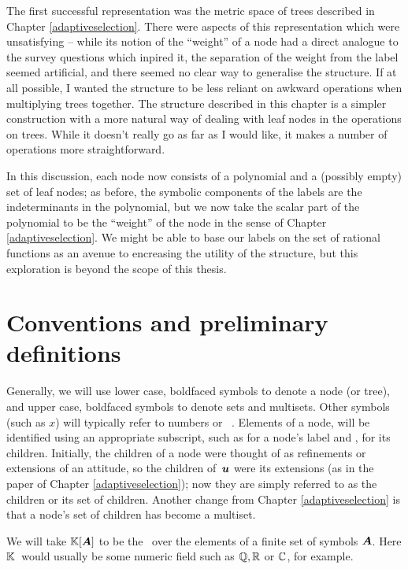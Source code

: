 The first successful representation was the metric space of trees
described in Chapter \ref{adaptiveselection}.  There were aspects of
this representation which were unsatisfying -- while its notion of the
``weight'' of a node had a direct analogue to the survey questions which
inpired it, the separation of the weight from the label seemed
artificial, and there seemed no clear way to generalise the
structure. If at all possible, I wanted the structure to be less reliant
on awkward operations when multiplying trees together.  The structure
described in this chapter is a simpler construction with a more natural
way of dealing with leaf nodes in the operations on trees. While it
doesn't really go as far as I would like, it makes a number of
operations more straightforward.

In this discussion, each node now consists of a polynomial and a
(possibly empty) set of leaf nodes; as before, the symbolic components
of the labels are the indeterminants in the polynomial, but we now
take the scalar part of the polynomial to be the ``weight'' of the
node in the sense of Chapter \ref{adaptiveselection}.  We might be
able to base our labels on the set of rational functions as an avenue
to encreasing the utility of the structure, but this exploration is
beyond the scope of this thesis. 

\section{Conventions and preliminary definitions}

Generally, we will use lower case, boldfaced symbols to denote a node
(or tree), and upper case, boldfaced symbols to denote sets and
multisets.  Other symbols (such as $x$) will typically refer to
numbers or \polyrat\ \polyforms. Elements of a node,  will be
identified using an appropriate subscript, such as  for a
node's label and , for its children. Initially, the children
of a node were thought of as refinements or extensions of an attitude,
so the children of $\,\boldsymbol{u}$ were its extensions (as in the paper of
Chapter \ref{adaptiveselection}); now they are simply referred to as
the children or its set of children.  Another change from Chapter
\ref{adaptiveselection} is that a node's set of children has become a
multiset.

We will take $\mathbb{K}[{\boldsymbol{A}}]$ to be the \polytypes\ over the elements of a finite set of
symbols $\boldsymbol{A}$.  Here $\mathbb{K}$\ would usually be some numeric field such as $\mathbb{Q,
  R}$ or $\mathbb{C}$, for example.

